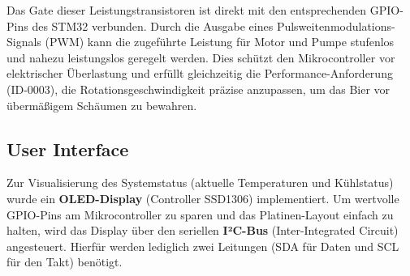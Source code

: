  Das Gate dieser Leistungstransistoren ist direkt mit den entsprechenden GPIO-Pins des STM32 verbunden. Durch die Ausgabe eines Pulsweitenmodulations-Signals (PWM) kann die zugeführte Leistung für Motor und Pumpe stufenlos und nahezu leistungslos geregelt werden. Dies schützt den Mikrocontroller vor elektrischer Überlastung und erfüllt gleichzeitig die Performance-Anforderung (ID-0003), die Rotationsgeschwindigkeit präzise anzupassen, um das Bier vor übermäßigem Schäumen zu bewahren.
 
 \subsection{User Interface}
 Zur Visualisierung des Systemstatus (aktuelle Temperaturen und Kühlstatus) wurde ein \textbf{OLED-Display} (Controller SSD1306) implementiert. Um wertvolle GPIO-Pins am Mikrocontroller zu sparen und das Platinen-Layout einfach zu halten, wird das Display über den seriellen \textbf{I²C-Bus} (Inter-Integrated Circuit) angesteuert. Hierfür werden lediglich zwei Leitungen (SDA für Daten und SCL für den Takt) benötigt.